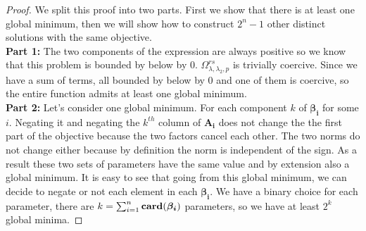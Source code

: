 \begin{proof}
  We  split this proof into two parts. First we show that there is at least
  one global minimum, then we will show how to construct $2^n - 1$ other distinct
  solutions with the same objective.
\\ \textbf{Part 1:}
The two components of the expression are always positive so we know that this problem is bounded by below by $0$. $\Omega_{\lambda, \lambda_2, p}^{rs}$ is trivially coercive. Since we have a sum of terms, all bounded by below by $0$ and one of them is coercive, so the entire function admits at least one global minimum.
\\ \textbf{Part 2:} Let's consider one global minimum. For each component $k$ of $\bm{\beta_i}$ for some $i$. Negating it and negating the $k^{th}$ column of $\bm{A_i}$ does not change the the first part of the objective because the two factors cancel each other. The two norms do not change either because by definition the norm is independent of the sign. As a result these two sets of parameters have the same value and by extension also a global minimum. It is easy to see that going from this global minimum, we can decide to negate or not each element in each $\bm{\beta_i}$. We have a binary choice for each parameter, there are $k = \sum_{i=1}^n {\bf card}(\bm{\beta_i})$ parameters, so we have at least $2^k$ global minima.

\end{proof}

%
%



